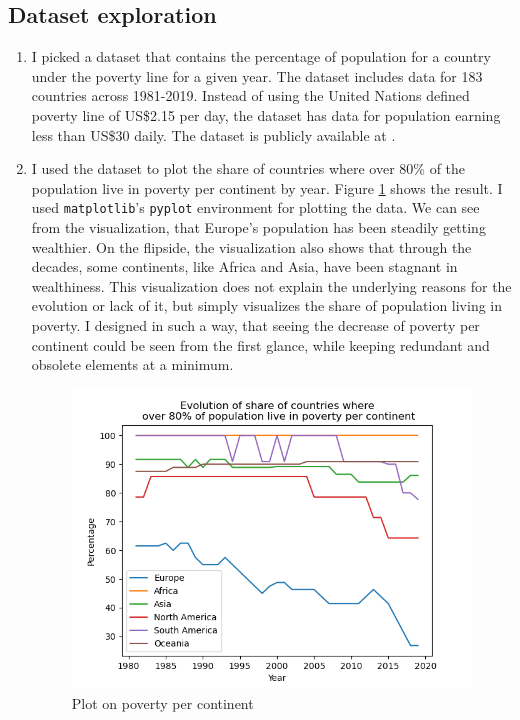 \documentclass[11pt,a4paper,titlepage]{article}
\begin{document}
\subsection{Dataset exploration}
\begin{enumerate}
    \item I picked a dataset that contains the percentage of population for a country under the poverty line for a given year. The dataset includes data for 183 countries across 1981-2019. Instead of using the United Nations defined poverty line of US\$2.15 per day, the dataset has data for population earning less than US\$30 daily. The dataset is publicly available at \cite{data}.
    \item I used the dataset to plot the share of countries where over 80\% of the population live in poverty per continent by year. Figure \ref{fig:plot} shows the result. I used \texttt{matplotlib}'s \texttt{pyplot} environment for plotting the data. We can see from the visualization, that Europe's population has been steadily getting wealthier. On the flipside, the visualization also shows that through the decades, some continents, like Africa and Asia, have been stagnant in wealthiness. This visualization does not explain the underlying reasons for the evolution or lack of it, but simply visualizes the share of population living in poverty. I designed in such a way, that seeing the decrease of poverty per continent could be seen from the first glance, while keeping redundant and obsolete elements at a minimum. 

    \begin{figure}[h!]
        \centering
        \includegraphics[width=0.8\linewidth]{reports/assignment-1/imgs/plot.png}
        \caption{Plot on poverty per continent}
        \label{fig:plot}
    \end{figure}
\end{enumerate}

\newpage

\end{document}
